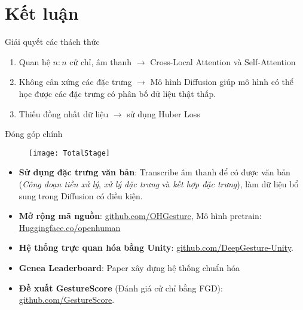 
\section{Kết luận}

\begin{frame}{Giải quyết các thách thức}
		\begin{enumerate}
			\item Quan hệ $n:n$ cử chỉ, âm thanh $\rightarrow$ Cross-Local Attention và Self-Attention
			\item Không cân xứng các đặc trưng $\rightarrow$ Mô hình Diffusion giúp mô hình có thể học được các đặc trưng có phân bố dữ liệu thật thấp.
				\item Thiếu đồng nhất dữ liệu $\rightarrow$ sử dụng Huber Loss
		\end{enumerate}
\end{frame}

\begin{frame}{Đóng góp chính}
	
	\begin{figure}
		\centering
		\texttt{[image: TotalStage]}
	\end{figure}
	
	\begin{itemize}
		\item \textbf{Sử dụng đặc trưng văn bản}: Transcribe âm thanh để có được văn bản (\textit{Công đoạn tiền xử lý}, \textit{xử lý đặc trưng} và \textit{kết hợp đặc trưng}), làm dữ liệu bổ sung trong Diffusion có điều kiện. 
		
		\item \textbf{Mở rộng mã nguồn}: \hyperlink{https://github.com/hmthanh/OHGesture}{github.com/OHGesture}, Mô hình pretrain: \hyperlink{https://huggingface.co/openhuman/openhuman}{Huggingface.co/openhuman}
		
		\item \textbf{Hệ thống trực quan hóa bằng Unity}: \hyperlink{https://github.com/DeepGesture/deepgesture-unity}{github.com/DeepGesture-Unity}.
		
		\item \textbf{Genea Leaderboard}: Paper xây dựng hệ thống chuẩn hóa
		
		\item \textbf{Đề xuất GestureScore} (Đánh giá cử chỉ bằng FGD): \hyperlink{https://github.com/GestureScore/GestureScore}{github.com/GestureScore}.
	\end{itemize}
\end{frame}

